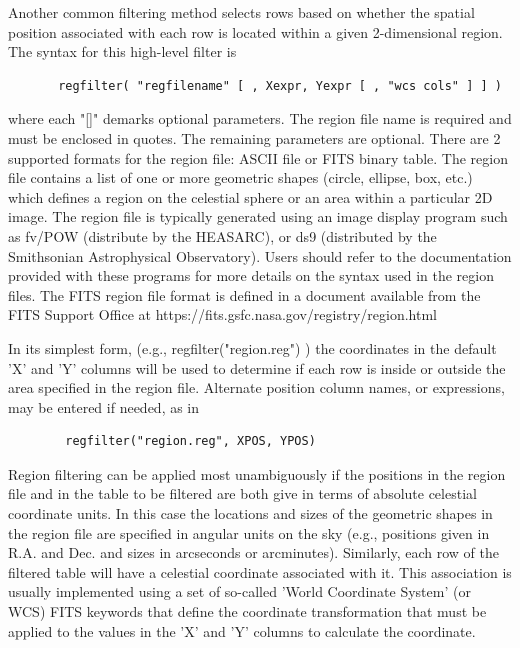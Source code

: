 \documentclass[11pt]{book}
\begin{document}
    Another common  filtering method selects rows based on whether the
    spatial position associated with each row is located within a given
    2-dimensional region.  The syntax for this high-level filter is

\begin{verbatim}
       regfilter( "regfilename" [ , Xexpr, Yexpr [ , "wcs cols" ] ] )
\end{verbatim}
    where each "[]" demarks optional parameters. The region file name
    is required and must be  enclosed in quotes.  The remaining
    parameters are optional.  There are 2 supported formats for the
    region file: ASCII file or FITS binary table.  The region file
    contains a list of one or more geometric shapes (circle,
    ellipse, box, etc.) which defines a region on the celestial sphere
    or an area within a particular 2D image.  The region file is
    typically generated using an image display program such as fv/POW
    (distribute by the HEASARC), or ds9 (distributed by the Smithsonian
    Astrophysical Observatory).  Users should refer to the documentation
    provided with these programs for more details on the syntax used in
    the region files.  The FITS region file format is defined in a document
    available from the FITS Support Office at
    https://fits.gsfc.nasa.gov/registry/region.html

    In its simplest form, (e.g., regfilter("region.reg") ) the
    coordinates in the default 'X' and 'Y' columns will be used to
    determine if each row is inside or outside the area specified in
    the region file.  Alternate position column names, or expressions,
    may be entered if needed, as in

\begin{verbatim}
        regfilter("region.reg", XPOS, YPOS)
\end{verbatim}
    Region filtering can be applied most unambiguously if the positions
    in the region file and in the table to be filtered are both give in
    terms of absolute celestial coordinate units.  In this case the
    locations and sizes of the geometric shapes in the region file are
    specified in angular units on the sky (e.g., positions given in
    R.A. and Dec.  and sizes in arcseconds or arcminutes).  Similarly,
    each row of the filtered table will have a celestial coordinate
    associated with it.  This association is usually implemented using
    a set of so-called 'World Coordinate System' (or WCS) FITS keywords
    that define the coordinate transformation that must be applied to
    the values in the 'X' and 'Y' columns to calculate the coordinate.
\end{document}

